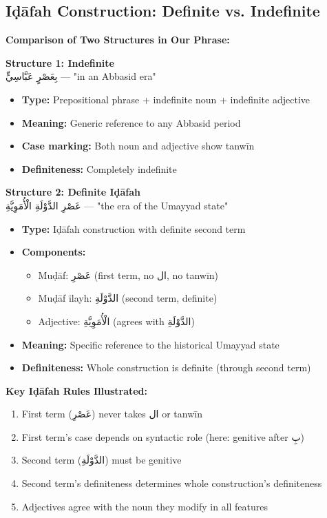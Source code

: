 \documentclass[letterpaper,12pt]{article}
\begin{document}
\subsection{Iḍāfah Construction: Definite vs. Indefinite}

\begin{tcolorbox}[colback=white,colframe=accentcolor,breakable]
\textbf{Comparison of Two Structures in Our Phrase:}

\textbf{Structure 1: Indefinite}\\
\textarabic{بِعَصْرٍ عَبَّاسِيٍّ} — "in an Abbasid era"

\begin{itemize}
\item \textbf{Type:} Prepositional phrase + indefinite noun + indefinite adjective
\item \textbf{Meaning:} Generic reference to any Abbasid period
\item \textbf{Case marking:} Both noun and adjective show tanwīn
\item \textbf{Definiteness:} Completely indefinite
\end{itemize}

\textbf{Structure 2: Definite Iḍāfah}\\
\textarabic{عَصْرِ الدَّوْلَةِ الْأُمَوِيَّةِ} — "the era of the Umayyad state"

\begin{itemize}
\item \textbf{Type:} Iḍāfah construction with definite second term
\item \textbf{Components:}
  \begin{itemize}
  \item Muḍāf: \textarabic{عَصْرِ} (first term, no \textarabic{ال}, no tanwīn)
  \item Muḍāf ilayh: \textarabic{الدَّوْلَةِ} (second term, definite)
  \item Adjective: \textarabic{الْأُمَوِيَّةِ} (agrees with \textarabic{الدَّوْلَةِ})
  \end{itemize}
\item \textbf{Meaning:} Specific reference to the historical Umayyad state
\item \textbf{Definiteness:} Whole construction is definite (through second term)
\end{itemize}

\vspace{0.5em}
\textbf{Key Iḍāfah Rules Illustrated:}
\begin{enumerate}
\item First term (\textarabic{عَصْرِ}) never takes \textarabic{ال} or tanwīn
\item First term's case depends on syntactic role (here: genitive after \textarabic{بِ})
\item Second term (\textarabic{الدَّوْلَةِ}) must be genitive
\item Second term's definiteness determines whole construction's definiteness
\item Adjectives agree with the noun they modify in all features
\end{enumerate}


\end{tcolorbox}
\end{document}
